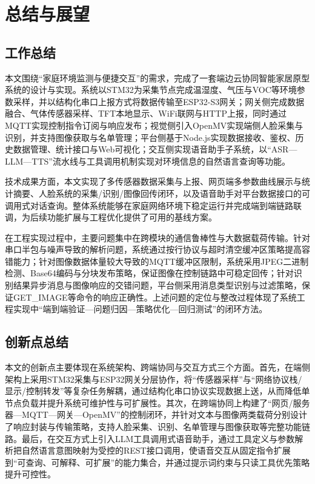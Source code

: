 
\section{总结与展望}

\subsection{工作总结}
\par 本文围绕“家庭环境监测与便捷交互”的需求，完成了一套端边云协同智能家居原型系统的设计与实现。系统以STM32为采集节点完成温湿度、气压与VOC等环境参数采样，并以结构化串口上报方式将数据传输至ESP32-S3网关；网关侧完成数据融合、气体传感器采样、TFT本地显示、WiFi联网与HTTP上报，同时通过MQTT实现控制指令订阅与响应发布；视觉侧引入OpenMV实现端侧人脸采集与识别，并支持图像获取与名单管理；平台侧基于Node.js实现数据接收、鉴权、历史数据管理、统计接口与Web可视化；交互侧实现语音助手子系统，以“ASR—LLM—TTS”流水线与工具调用机制实现对环境信息的自然语言查询等功能。
\par 技术成果方面，本文实现了多传感器数据采集与上报、网页端多参数曲线展示与统计摘要、人脸系统的采集/识别/图像回传闭环，以及语音助手对平台数据接口的可调用式对话查询。整体系统能够在家庭网络环境下稳定运行并完成端到端链路联调，为后续功能扩展与工程优化提供了可用的基线方案。
\par 在工程实现过程中，主要问题集中在跨模块的通信鲁棒性与大数据载荷传输。针对串口半包与噪声导致的解析问题，系统通过按行协议与超时清空缓冲区策略提高容错能力；针对图像数据体量较大导致的MQTT缓冲区限制，系统采用JPEG二进制检测、Base64编码与分块发布策略，保证图像在控制链路中可稳定回传；针对识别结果异步消息与图像响应的交错问题，平台侧采用消息类型识别与过滤策略，保证GET\_IMAGE等命令的响应正确性。上述问题的定位与整改过程体现了系统工程实现中“端到端验证—问题归因—策略优化—回归测试”的闭环方法。

\subsection{创新点总结}
\par 本文的创新点主要体现在系统架构、跨端协同与交互方式三个方面。首先，在端侧架构上采用STM32采集与ESP32网关分层协作，将“传感器采样”与“网络协议栈/显示/控制转发”等复杂任务解耦，通过结构化串口协议实现数据上送，从而降低单节点负载并提升系统可维护性与可扩展性。其次，在跨端协同上构建了“网页/服务器—MQTT—网关—OpenMV”的控制闭环，并针对文本与图像两类载荷分别设计了响应封装与传输策略，支持人脸采集、识别、名单管理与图像获取等完整功能链路。最后，在交互方式上引入LLM工具调用式语音助手，通过工具定义与参数解析把自然语言意图映射为受控的REST接口调用，使语音交互从固定指令扩展到“可查询、可解释、可扩展”的能力集合，并通过提示词约束与只读工具优先策略提升可控性。

